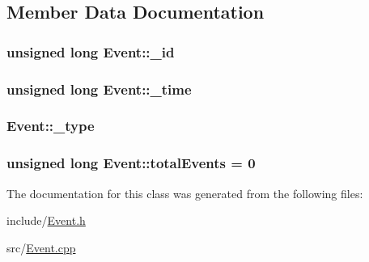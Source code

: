 \subsection{Member Data Documentation}
\hypertarget{class_event_a3a2f9bab41280ee0d767ec8390b1812a}{}
\subsubsection[{\+\_\+id}]{\setlength{\rightskip}{0pt plus 5cm}unsigned long Event\+::\+\_\+id\hspace{0.3cm}{\ttfamily [protected]}}\label{class_event_a3a2f9bab41280ee0d767ec8390b1812a}
\hypertarget{class_event_a07e28c531b6374af308c059990938bf5}{}
\subsubsection[{\+\_\+time}]{\setlength{\rightskip}{0pt plus 5cm}unsigned long Event\+::\+\_\+time\hspace{0.3cm}{\ttfamily [protected]}}\label{class_event_a07e28c531b6374af308c059990938bf5}
\hypertarget{class_event_ac39a6517d8bfadbb3bbaf97a077a5cdf}{}
\subsubsection[{\+\_\+type}]{ Event\+::\+\_\+type\hspace{0.3cm}{\ttfamily [protected]}}\label{class_event_ac39a6517d8bfadbb3bbaf97a077a5cdf}
\hypertarget{class_event_af56653a3bf07521930251f7f93391cef}{}
\subsubsection[{total\+Events}]{\setlength{\rightskip}{0pt plus 5cm}unsigned long Event\+::total\+Events = 0\hspace{0.3cm}{\ttfamily [static]}}\label{class_event_af56653a3bf07521930251f7f93391cef}


The documentation for this class was generated from the following files\+:\begin{DoxyCompactItemize}
\item 
include/\hyperlink{_event_8h}{Event.\+h}\item 
src/\hyperlink{_event_8cpp}{Event.\+cpp}\end{DoxyCompactItemize}
